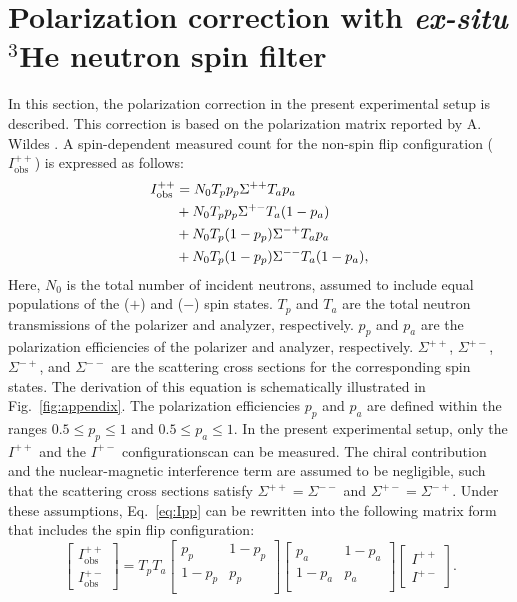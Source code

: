 \documentclass[%
 reprint,
superscriptaddress,
 amsmath,amssymb,
 aps,
floatfix,
]{revtex4-2}
\newcommand{\He}{$^3$He }
\begin{document}
\section{Polarization correction with \textit{ex-situ} \He neutron spin filter}
\label{appendix}
In this section, the polarization correction in the present experimental setup is described.
This correction is based on the polarization matrix reported by A. Wildes \cite{wildes_polarizer-analyzer_1999,wildes_scientific_2006}.
A spin-dependent measured count for the non-spin flip configuration ($I^{++}_\mathrm{obs}$) is expressed as follows:
\begin{align}
    I^{++}_\mathrm{obs} &= N_0 T_p p_p \Sigma^{++} T_a p_a \notag \\
    &+ N_0 T_p p_p \Sigma^{+-} T_a (1-p_a) \notag\\
    &+N_0 T_p (1-p_p) \Sigma^{-+} T_a p_a \notag \\
    &+ N_0 T_p (1-p_p) \Sigma^{--} T_a (1-p_a),
    \label{eq:Ipp}
\end{align}
Here, $N_0$ is the total number of incident neutrons, assumed to include equal populations of the ($+$) and ($-$) spin states.
$T_p$ and $T_a$ are the total neutron transmissions of the polarizer and analyzer, respectively.
$p_p$ and $p_a$ are the polarization efficiencies of the polarizer and analyzer, respectively.
$\Sigma^{++}$, $\Sigma^{+-}$, $\Sigma^{-+}$, and $\Sigma^{--}$ are the scattering cross sections for the corresponding spin states.
The derivation of this equation is schematically illustrated in Fig.~\ref{fig:appendix}.
The polarization efficiencies $p_p$ and $p_a$ are defined within the ranges $0.5 \leq p_p \leq 1$ and $0.5 \leq p_a \leq 1$.
In the present experimental setup, only the $I^{++}$ and the $I^{+-}$ configurationscan can be measured.
The chiral contribution and the nuclear-magnetic interference term are assumed to be negligible, such that the scattering cross sections satisfy $\Sigma^{++} = \Sigma^{--}$ and $\Sigma^{+-} = \Sigma^{-+}$.
Under these assumptions, Eq.~\ref{eq:Ipp} can be rewritten into the following matrix form that includes the spin flip configuration:
\begin{equation}
    \begin{bmatrix}
        I^{++}_\mathrm{obs} \\
        I^{+-}_\mathrm{obs}
    \end{bmatrix}
    =
    T_pT_a
    \begin{bmatrix}
        p_p & 1-p_p \\
        1-p_p & p_p \\
    \end{bmatrix}
    \begin{bmatrix}
        p_a&1-p_a \\
        1-p_a&p_a \\
    \end{bmatrix}
    \begin{bmatrix}
        I^{++} \\
        I^{+-}
    \end{bmatrix}.
    \label{eq:Ipp_Ipm}
\end{equation}
\end{document}
